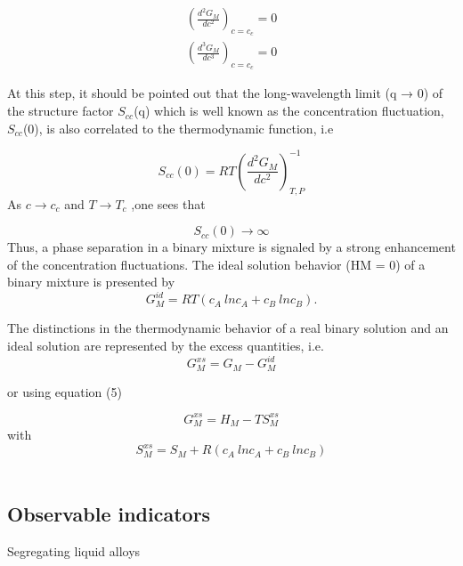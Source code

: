 \documentclass[12pt]{article}
\newcommand*{\1}{\hspace{1pt}}
\begin{document}
    \begin{align}
        \left(\frac{d^2 {G _M}}{d c^2} \right) _{c = c_c} = 0 \\
        \left(\frac{d^3 {G _M}}{d c^3} \right) _{c = c_c} = 0 
    \end{align}


    At this step, it should be pointed out that the long-wavelength limit (q → 0) of
the structure factor $S _{cc} $(q) which is well known as the
concentration fluctuation, $S _{cc} $(0), is also correlated to the thermodynamic function, i.e

    \begin{equation}
        S_{cc}(0) =  RT \left(\frac{d^2 G _M}{d c^2} \right) ^ {-1}_ {T,P}
    \end{equation}
As $ c\to c _c$ and $ T\to T_c $ ,one sees that

    \begin{equation}
        S_{cc}(0) \to \infty
    \end{equation}  
Thus, a phase separation in a binary mixture is signaled by a strong enhancement of the
concentration fluctuations. 
The ideal solution behavior (HM = 0) of a binary mixture is presented by
    \begin{equation}
        G ^ {id} _M = RT (c_A \ ln c_A + c_B \ ln c_B).
    \end{equation}

The distinctions in the thermodynamic behavior of a real binary solution and an ideal solution 
are represented by the excess quantities, i.e.
    \begin{equation}
        G ^ {xs} _M = G _M - G ^{id} _M
    \end{equation}

or using equation (5)

    \begin{equation}
        G ^ {xs} _M = H _M - T S ^{xs} _M
    \end{equation}
with
    \begin{equation}
        S ^{xs} _M = S _M + R (c _A \ ln c_A + c _B \ ln c _B)
    \end{equation}\\



\subsection*{Observable indicators}


Segregating liquid alloys\\
\end{document}
